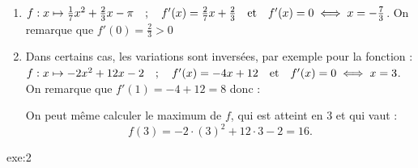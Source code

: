 {\begin{enumerate}
 On remarque que $f'(1)=12 >0$
\begin{center}
\end{center}
\item $f:x \mapsto \frac17x^2 + \frac23 x - \pi \quad ; \quad f'(x) = \frac27x + \frac23 \quad \text{et} \quad f'(x) = 0 \iff x = -\frac73$. \newline
On remarque que $f'(0)= \frac23 >0$
\begin{center}
\end{center}
\item Dans certains cas, les variations sont inversées, par exemple pour la fonction : \newline
$f : x \mapsto -2x^2 + 12x -2 \quad ; \quad f'(x) = -4x +12 \quad \text{et} \quad f'(x) = 0 \iff x=3$. On remarque que $f'(1) = -4+12 = 8$ donc :
\begin{center}
\end{center}
On peut même calculer le maximum de $f$, qui est atteint en $3$ et qui vaut : 
\[ f(3) = -2 \cdot (3)^2 +12 \cdot 3 -2 = 16. \]
\end{enumerate}
}{exe:2}{

}
\newpage

